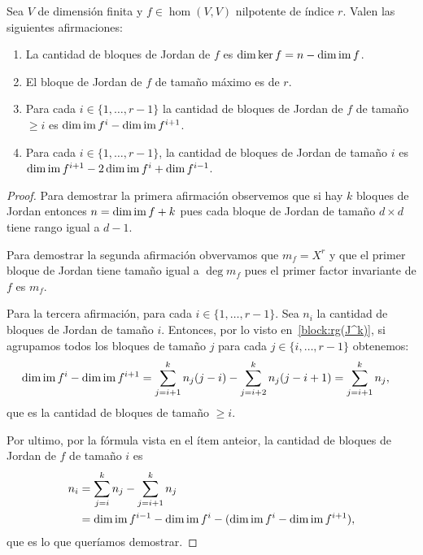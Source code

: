 \begin{cor}
	\label{cor:Jordan:nilpotente}
    Sea $V$ de dimensión finita y $f\in\hom(V,V)$ nilpotente de índice $r$.
    Valen las siguientes afirmaciones:
    \begin{enumerate}
        \item La cantidad de bloques de Jordan de $f$ es $\dim\ker f=n-\dim\operatorname{im} f$. 
        \item El bloque de Jordan de $f$ de tamaño máximo es de $r$. 
        \item Para cada $i\in\{1,\dots,r-1\}$ la cantidad de bloques de Jordan
            de $f$ de tamaño $\geq i$ es $\dim\operatorname{im} f^i-\dim\operatorname{im} f^{i+1}$. 
        \item Para cada $i\in\{1,\dots,r-1\}$, la cantidad de bloques de Jordan
            de tamaño $i$ es $\dim\operatorname{im} f^{i+1}-2\dim\operatorname{im} f^i+\dim
            f^{i-1}$. 
    \end{enumerate}

    \begin{proof}
		Para demostrar la primera afirmación observemos que si hay $k$ bloques
		de Jordan entonces $n=\dim\operatorname{im} f+k$ pues cada bloque de Jordan de tamaño
		$d\times d$ tiene rango igual a $d-1$. 

		Para demostrar la segunda afirmación obvervamos que $m_f=X^r$ y que el
		primer bloque de Jordan tiene tamaño igual a $\deg m_f$ pues el primer
		factor invariante de $f$ es $m_f$. 

		Para la tercera afirmación, para cada $i\in\{1,\dots,r-1\}$. Sea $n_i$
		la cantidad de bloques de Jordan de tamaño $i$. Entonces, por lo visto
		en~\ref{block:rg(J^k)}, si agrupamos todos los bloques de tamaño $j$
		para cada $j\in\{i,\dots,r-1\}$ obtenemos:
        \begin{align*}
            \dim \operatorname{im} f^i-\dim\operatorname{im} f^{i+1}&=\sum_{j=i+1}^k n_j(j-i)-\sum_{j=i+2}^kn_j(j-i+1)
            =\sum_{j=i+1}^kn_j,
        \end{align*}
        que es la cantidad de bloques de tamaño $\geq i$. 

        Por ultimo, por la fórmula vista en el ítem anteior, la cantidad
        de bloques de Jordan de $f$ de tamaño $i$ es
        \begin{align*}
            n_i&=\sum_{j=i}^kn_j-\sum_{j=i+1}^kn_j\\
            &=\dim\operatorname{im} f^{i-1}-\dim\operatorname{im} f^i-(\dim\operatorname{im} f^i-\dim\operatorname{im} f^{i+1}),
        \end{align*}
        que es lo que queríamos demostrar.
    \end{proof}
\end{cor}

